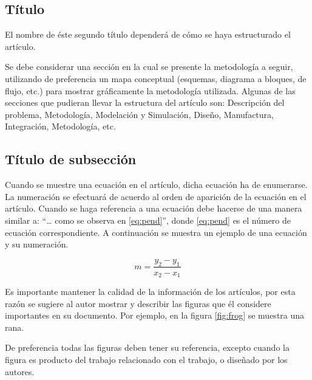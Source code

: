 \documentclass[10pt]{article}
\begin{document}
\newpage %
\vspace{0.5cm}
\begin{center}
    \section{Título}
\end{center}

    El nombre de éste segundo título dependerá de cómo se haya estructurado el artículo.
    
    Se debe considerar una sección en la cual se presente la metodología a seguir, utilizando de preferencia un mapa conceptual (esquemas, diagrama a bloques, de flujo, etc.) para mostrar gráficamente la metodología utilizada. Algunas de las secciones que pudieran llevar la estructura del artículo son: Descripción del problema, Metodología, Modelación y Simulación, Diseño, Manufactura, Integración, Metodología, etc.

    \subsection{Título de subsección}

        Cuando se muestre una ecuación en el artículo, dicha ecuación ha de enumerarse. La numeración se efectuará de acuerdo al orden de aparición de la ecuación en el artículo. Cuando se haga referencia a una ecuación debe hacerse de una manera similar a: “… como se observa en \ref{eq:pend}”, donde \ref{eq:pend} es el número de ecuación correspondiente. A continuación se muestra un ejemplo de una ecuación y su numeración.

        \vspace{0.5cm}
        \begin{equation}
            m=\frac{y_2-y_1}{x_2-x_1}
            \label{eq:pend}
        \end{equation}
        \vspace{0.5cm}

        Es importante mantener la calidad de la información de los artículos, por esta razón se sugiere al autor mostrar y describir las figuras que él considere importantes en su documento. Por ejemplo, en la figura \ref{fig:frog} se muestra una rana.

        De preferencia todas las figuras deben tener su referencia, excepto cuando la figura es producto del trabajo relacionado con el trabajo, o diseñado por los autores.
        
\end{document}
